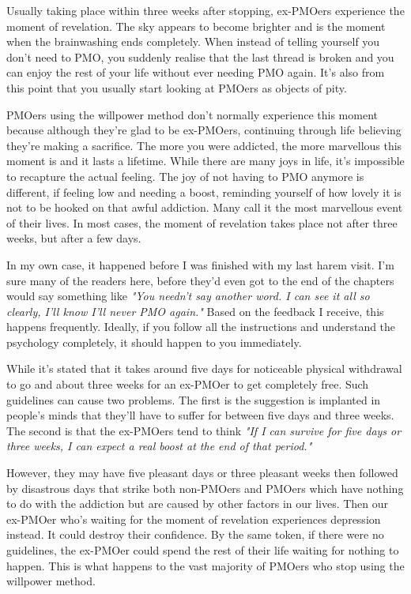 \documentclass[easypeasy.tex]{subfiles}
\begin{document}
Usually taking place within three weeks after stopping, ex-PMOers experience the moment of revelation. The sky appears to become brighter and is the moment when the brainwashing ends completely. When instead of telling yourself you don't need to PMO, you suddenly realise that the last thread is broken and you can enjoy the rest of your life without ever needing PMO again. It's also from this point that you usually start looking at PMOers as objects of pity.

PMOers using the willpower method don't normally experience this moment because although they're glad to be ex-PMOers, continuing through life believing they're making a sacrifice. The more you were addicted, the more marvellous this moment is and it lasts a lifetime. While there are many joys in life, it's impossible to recapture the actual feeling. The joy of not having to PMO anymore is different, if feeling low and needing a boost, reminding yourself of how lovely it is not to be hooked on that awful addiction. Many call it the most marvellous event of their lives. In most cases, the moment of revelation takes place not after three weeks, but after a few days. 

In my own case, it happened before I was finished with my last harem visit. I'm sure many of the readers here, before they'd even got to the end of the chapters would say something like \textit{"You needn't say another word. I can see it all so clearly, I'll know I'll never PMO again."} Based on the feedback I receive, this happens frequently. Ideally, if you follow all the instructions and understand the psychology completely, it should happen to you immediately.

While it's stated that it takes around five days for noticeable physical withdrawal to go and about three weeks for an ex-PMOer to get completely free. Such guidelines can cause two problems. The first is the suggestion is implanted in people's minds that they'll have to suffer for between five days and three weeks. The second is that the ex-PMOers tend to think \textit{"If I can survive for five days or three weeks, I can expect a real boost at the end of that period."}

However, they may have five pleasant days or three pleasant weeks then followed by disastrous days that strike both non-PMOers and PMOers which have nothing to do with the addiction but are caused by other factors in our lives. Then our ex-PMOer who's waiting for the moment of revelation experiences depression instead. It could destroy their confidence. By the same token, if there were no guidelines, the ex-PMOer could spend the rest of their life waiting for nothing to happen. This is what happens to the vast majority of PMOers who stop using the willpower method.
\end{document}
